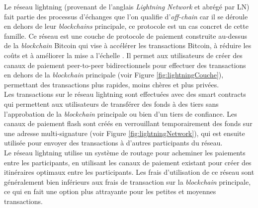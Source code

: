 Le réseau lightning (provenant de l'anglais \textit{Lightning Network} et abrégé par LN) fait partie des processus d'échanges que l'on qualifie d'\textit{off-chain} car il se déroule en dehors de leur \textit{\gls{blockchain}s} principale, ce protocole est un cas concret de cette famille.
Ce réseau est une couche de protocole de paiement construite au-dessus de la \textit{\gls{blockchain}} Bitcoin qui vise à accélérer les transactions  Bitcoin, à réduire les coûts et à améliorer la mise a l'échelle \cite{poon2016bitcoin}.
Il permet aux utilisateurs de créer des canaux de paiement peer-to-peer bidirectionnels  pour effectuer des transactions en dehors de la \textit{\gls{blockchain}} principale (voir Figure \ref{fig:lightningCouche}), permettant des transactions plus rapides, moins chères et plus privées.\\
Les transactions sur le réseau lightning sont effectuées avec des \gls{smart contract}s qui permettent aux utilisateurs de transférer des fonds à des tiers sans l'approbation de la \textit{\gls{blockchain}} principale ou bien d'un tiers de confiance. 
Les canaux de paiement flash sont créés en verrouillant temporairement des fonds sur une adresse multi-signature (voir Figure \ref{fig:lightningNetwork}), qui est ensuite utilisée pour envoyer des transactions à d'autres participants du réseau.\\ 
Le réseau lightning utilise un système de routage pour acheminer les paiements entre les participants, en utilisant les canaux de paiement existant pour créer des itinéraires optimaux entre les participants. 
Les frais d'utilisation de ce réseau sont généralement bien inférieurs aux frais de transaction sur la \textit{\gls{blockchain}} principale, ce qui en fait une option plus attrayante pour les  petites et moyennes transactions.

